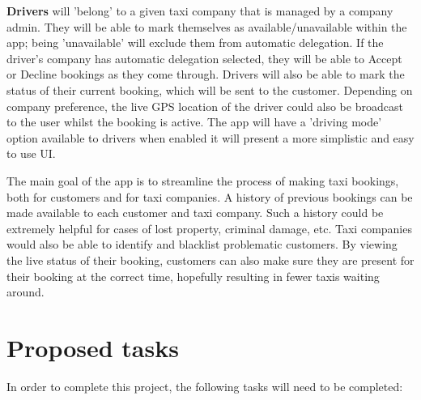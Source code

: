 \documentclass[11pt,fleqn,twoside]{article}
\begin{document}
\textbf{Drivers} will 'belong' to a given taxi company that is managed by a company admin. They will be able to mark themselves as available/unavailable within the app; being 'unavailable' will exclude them from automatic delegation. If the driver's company has automatic delegation selected, they will be able to Accept or Decline bookings as they come through. Drivers will also be able to mark the status of their current booking, which will be sent to the customer. Depending on company preference, the live GPS location of the driver could also be broadcast to the user whilst the booking is active. The app will have a 'driving mode' option available to drivers when enabled it will present a more simplistic and easy to use UI. \par

The main goal of the app is to streamline the process of making taxi bookings, both for customers and for taxi companies. A history of previous bookings can be made available to each customer and taxi company. Such a history could be extremely helpful for cases of lost property, criminal damage, etc. Taxi companies would also be able to identify and blacklist problematic customers. By viewing the live status of their booking, customers can also make sure they are present for their booking at the correct time, hopefully resulting in fewer taxis waiting around. \par


\section{Proposed tasks} \label{proposed_tasks}
In order to complete this project, the following tasks will need to be completed:
\end{document}
